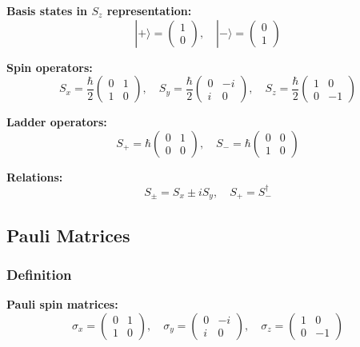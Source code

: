 \documentclass[11pt,a4paper]{article}
\begin{document}
\textbf{Basis states in $S_z$ representation:}
\begin{equation}
|+\rangle = \begin{pmatrix} 1 \\ 0 \end{pmatrix}, \quad |-\rangle = \begin{pmatrix} 0 \\ 1 \end{pmatrix}
\tag{S.1}
\end{equation}

\textbf{Spin operators:}
\begin{equation}
\boxed{S_x = \frac{\hbar}{2}\begin{pmatrix} 0 & 1 \\ 1 & 0 \end{pmatrix}, \quad 
S_y = \frac{\hbar}{2}\begin{pmatrix} 0 & -i \\ i & 0 \end{pmatrix}, \quad 
S_z = \frac{\hbar}{2}\begin{pmatrix} 1 & 0 \\ 0 & -1 \end{pmatrix}}
\tag{S.2}
\end{equation}

\textbf{Ladder operators:}
\begin{equation}
S_+ = \hbar\begin{pmatrix} 0 & 1 \\ 0 & 0 \end{pmatrix}, \quad 
S_- = \hbar\begin{pmatrix} 0 & 0 \\ 1 & 0 \end{pmatrix}
\tag{S.3}
\end{equation}

\textbf{Relations:}
\begin{equation}
S_\pm = S_x \pm iS_y, \quad S_+ = S_-^\dagger
\tag{S.4}
\end{equation}

\subsection{Pauli Matrices}

\subsubsection{Definition}

\textbf{Pauli spin matrices:}
\begin{equation}
\boxed{\sigma_x = \begin{pmatrix} 0 & 1 \\ 1 & 0 \end{pmatrix}, \quad 
\sigma_y = \begin{pmatrix} 0 & -i \\ i & 0 \end{pmatrix}, \quad 
\sigma_z = \begin{pmatrix} 1 & 0 \\ 0 & -1 \end{pmatrix}}
\tag{S.5}
\end{equation}
\end{document}

